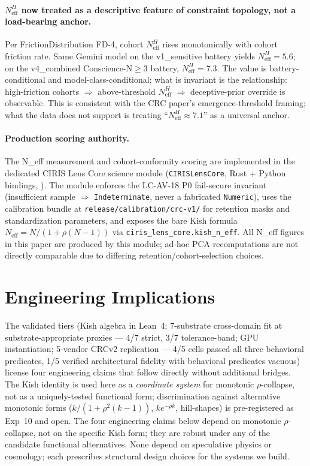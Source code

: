 \documentclass[11pt,a4paper]{article}
\begin{document}
\paragraph{$N_{\text{eff}}^H$ now treated as a descriptive feature of constraint topology, not a load-bearing anchor.} Per FrictionDistribution FD-4, cohort $N_{\text{eff}}^H$ rises monotonically with cohort friction rate. Same Gemini model on the v1\_sensitive battery yields $N_{\text{eff}}^H = 5.6$; on the v4\_combined Conscience-N$\geq$3 battery, $N_{\text{eff}}^H = 7.3$. The value is battery-conditional and model-class-conditional; what is invariant is the relationship: high-friction cohorts $\Rightarrow$ above-threshold $N_{\text{eff}}^H$ $\Rightarrow$ deceptive-prior override is observable. This is consistent with the CRC paper's emergence-threshold framing; what the data does not support is treating ``$N_{\text{eff}}^H \approx 7.1$'' as a universal anchor.

\paragraph{Production scoring authority.} The N\_eff measurement and cohort-conformity scoring are implemented in the dedicated CIRIS Lens Core science module (\texttt{CIRISLensCore}, Rust + Python bindings, \cite{cirislens_repo}). The module enforces the LC-AV-18 P0 fail-secure invariant (insufficient sample $\Rightarrow$ \texttt{Indeterminate}, never a fabricated \texttt{Numeric}), uses the calibration bundle at \texttt{release/calibration/crc-v1/} for retention masks and standardization parameters, and exposes the bare Kish formula $N_{\text{eff}} = N/(1+\rho(N-1))$ via \texttt{ciris\_lens\_core.kish\_n\_eff}. All N\_eff figures in this paper are produced by this module; ad-hoc PCA recomputations are not directly comparable due to differing retention/cohort-selection choices.

\section{Engineering Implications}
\label{sec:implications}

The validated tiers (Kish algebra in Lean~4; 7-substrate cross-domain fit at substrate-appropriate proxies --- 4/7 strict, 3/7 tolerance-band; GPU instantiation; 5-vendor CRCv2 replication --- 4/5 cells passed all three behavioral predicates, 1/5 verified architectural fidelity with behavioral predicates vacuous) license four engineering claims that follow directly without additional bridges. The Kish identity is used here as a \emph{coordinate system} for monotonic $\rho$-collapse, not as a uniquely-tested functional form; discrimination against alternative monotonic forms ($k/(1+\rho^2(k-1))$, $k e^{-\rho k}$, hill-shapes) is pre-registered as Exp~10 and open. The four engineering claims below depend on monotonic $\rho$-collapse, not on the specific Kish form; they are robust under any of the candidate functional alternatives. None depend on speculative physics or cosmology; each prescribes structural design choices for the systems we build.
\end{document}
